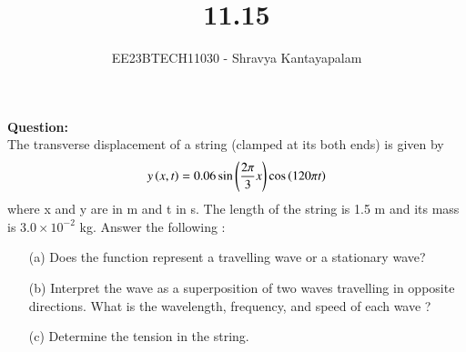 \documentclass[journal,12pt,twocolumn]{IEEEtran}
\theoremstyle{remark}
\begin{document}
\title{11.15}
\author{EE23BTECH11030 - Shravya Kantayapalam}
\maketitle
\newpage
\bigskip

\renewcommand{\thefigure}{\theenumi}
\renewcommand{\thetable}{\theenumi}

\textbf{Question:}\\
The transverse displacement of a string (clamped at its both ends) is given by
\begin{align}
y\left(x, t\right) = 0.06 \sin{\ensuremath{\left(\dfrac{2\pi}{3}x\right)}} \cos{\ensuremath{\left(120 \pi t\right)}}
\end{align}
where x and y are in m and t in s. The length of the string is 1.5 m and its mass is
$3.0 \times 10^{-2}$ kg.
Answer the following :
\begin{enumerate}
	\item[(a)] Does the function represent a travelling wave or a stationary wave?
	\item[(b)] Interpret the wave as a superposition of two waves travelling in opposite directions. What is the wavelength, frequency, and speed of each wave ?
	\item[(c)] Determine the tension in the string.\\
\end{enumerate}
\end{document}
